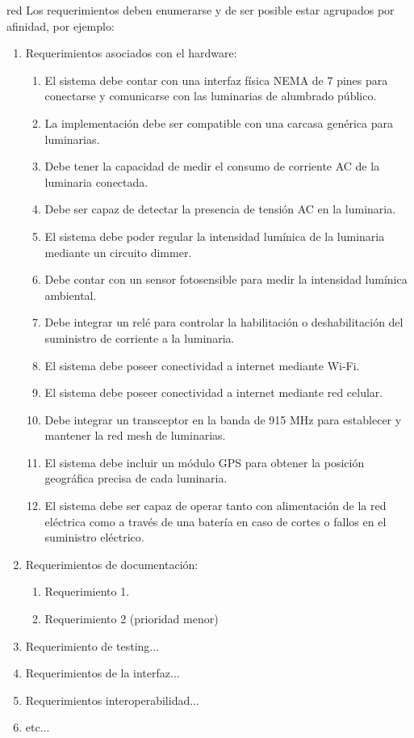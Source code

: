 \documentclass[
11pt, %
]{charter}
\begin{document}
\begin{consigna}{red}
Los requerimientos deben enumerarse y de ser posible estar agrupados por afinidad, por ejemplo:

\begin{enumerate}
	\item Requerimientos asociados con el hardware:
		\begin{enumerate}
			\item El sistema debe contar con una interfaz física NEMA de 7 pines para conectarse y comunicarse con las luminarias de alumbrado público.
			\item La implementación debe ser compatible con una carcasa genérica para luminarias.
			\item Debe tener la capacidad de medir el consumo de corriente AC de la luminaria conectada.
			\item Debe ser capaz de detectar la presencia de tensión AC en la luminaria.
 			\item El sistema debe poder regular la intensidad lumínica de la luminaria mediante un circuito dimmer.
			\item Debe contar con un sensor fotosensible para medir la intensidad lumínica ambiental.
			\item Debe integrar un relé para controlar la habilitación o deshabilitación del suministro de corriente a la luminaria.
			\item El sistema debe poseer conectividad a internet mediante Wi-Fi.
			\item El sistema debe poseer conectividad a internet mediante red celular.
			\item Debe integrar un transceptor en la banda de 915 MHz para establecer y mantener la red mesh de luminarias.
			\item El sistema debe incluir un módulo GPS para obtener la posición geográfica precisa de cada luminaria.
			\item El sistema debe ser capaz de operar tanto con alimentación de la red eléctrica como a través de una batería en caso de cortes o fallos en el suministro eléctrico.
		\end{enumerate}
	\item Requerimientos de documentación:
		\begin{enumerate}
			\item Requerimiento 1.
			\item Requerimiento 2 (prioridad menor)
		\end{enumerate}
	\item Requerimiento de testing...
	\item Requerimientos de la interfaz...
	\item Requerimientos interoperabilidad...
	\item etc...
\end{enumerate}


\end{consigna}
\end{document}
